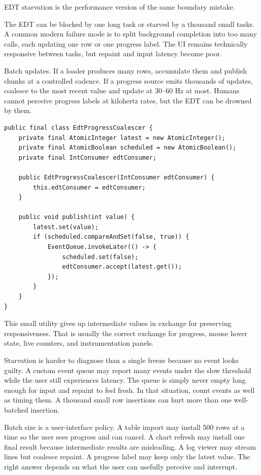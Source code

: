 EDT starvation is the performance version of the same boundary mistake.

The EDT can be blocked by one long task or starved by a thousand small tasks. A common modern failure mode is to split background completion into too many  calls, each updating one row or one progress label. The UI remains technically responsive between tasks, but repaint and input latency become poor.

Batch updates. If a loader produces many rows, accumulate them and publish chunks at a controlled cadence. If a progress source emits thousands of updates, coalesce to the most recent value and update at 30--60 Hz at most. Humans cannot perceive progress labels at kilohertz rates, but the EDT can be drowned by them.

\begin{lstlisting}[caption={Coalescing progress updates before posting to the EDT.}]
public final class EdtProgressCoalescer {
    private final AtomicInteger latest = new AtomicInteger();
    private final AtomicBoolean scheduled = new AtomicBoolean();
    private final IntConsumer edtConsumer;

    public EdtProgressCoalescer(IntConsumer edtConsumer) {
        this.edtConsumer = edtConsumer;
    }

    public void publish(int value) {
        latest.set(value);
        if (scheduled.compareAndSet(false, true)) {
            EventQueue.invokeLater(() -> {
                scheduled.set(false);
                edtConsumer.accept(latest.get());
            });
        }
    }
}
\end{lstlisting}

This small utility gives up intermediate values in exchange for preserving responsiveness. That is usually the correct exchange for progress, mouse hover state, live counters, and instrumentation panels.

Starvation is harder to diagnose than a single freeze because no event looks guilty. A custom event queue may report many events under the slow threshold while the user still experiences latency. The queue is simply never empty long enough for input and repaint to feel fresh. In that situation, count events as well as timing them. A thousand small row insertions can hurt more than one well-batched insertion.

Batch size is a user-interface policy. A table import may install 500 rows at a time so the user sees progress and can cancel. A chart refresh may install one final result because intermediate results are misleading. A log viewer may stream lines but coalesce repaint. A progress label may keep only the latest value. The right answer depends on what the user can usefully perceive and interrupt.

